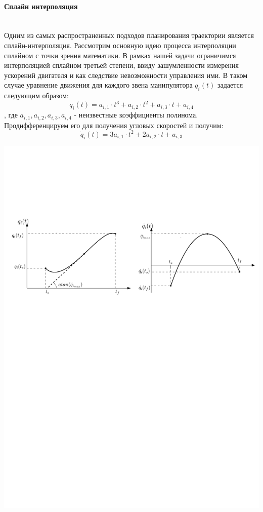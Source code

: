 \paragraph*{Сплайн интерполяция}$\phantom{-}$\\

Одним из самых распространенных подходов планирования траектории является сплайн-интерполяция. Рассмотрим основную идею процесса интерполяции сплайном с точки зрения математики. В рамках нашей задачи ограничимся интерполяцией сплайном третьей степени, ввиду зашумленности измерения ускорений двигателя и как следствие невозможности управления ими. В таком случае уравнение движения для каждого звена манипулятора $q_i(t)$ задается следующим образом:
\begin{equation}\label{eq:model}
q_i(t)=a_{i,1}\cdot t^3  + a_{i,2}\cdot t^2 + a_{i,3}\cdot t + a_{i,4}
\end{equation}
, где $a_{i,1}, a_{i,2}, a_{i,3}, a_{i,4}$ - неизвестные коэффициенты полинома.
Продифференцируем его для получения угловых скоростей и получим:
\begin{equation}\label{eq:model}
\dot{q}_i(t)=3a_{i,1}\cdot t^2  + 2a_{i,2}\cdot t + a_{i,3}
\end{equation}

\begin{center}
    \includegraphics[width=\textwidth]{Lab4/images/cubicTrjPlanning.pdf}\\
\end{center}

